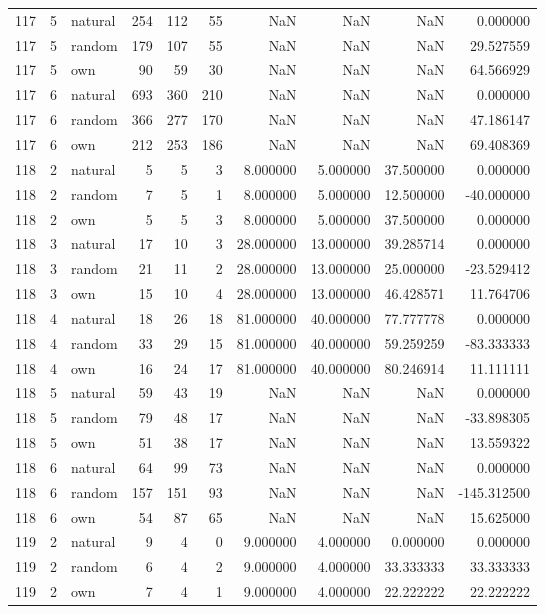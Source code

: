 \begin{table}[htbp]
\begin{tabular}{rrlrrrrrrr}
117 & 5 & natural & 254 & 112 & 55 & NaN & NaN & NaN & 0.000000 \\
117 & 5 & random & 179 & 107 & 55 & NaN & NaN & NaN & 29.527559 \\
117 & 5 & own & 90 & 59 & 30 & NaN & NaN & NaN & 64.566929 \\
117 & 6 & natural & 693 & 360 & 210 & NaN & NaN & NaN & 0.000000 \\
117 & 6 & random & 366 & 277 & 170 & NaN & NaN & NaN & 47.186147 \\
117 & 6 & own & 212 & 253 & 186 & NaN & NaN & NaN & 69.408369 \\
118 & 2 & natural & 5 & 5 & 3 & 8.000000 & 5.000000 & 37.500000 & 0.000000 \\
118 & 2 & random & 7 & 5 & 1 & 8.000000 & 5.000000 & 12.500000 & -40.000000 \\
118 & 2 & own & 5 & 5 & 3 & 8.000000 & 5.000000 & 37.500000 & 0.000000 \\
118 & 3 & natural & 17 & 10 & 3 & 28.000000 & 13.000000 & 39.285714 & 0.000000 \\
118 & 3 & random & 21 & 11 & 2 & 28.000000 & 13.000000 & 25.000000 & -23.529412 \\
118 & 3 & own & 15 & 10 & 4 & 28.000000 & 13.000000 & 46.428571 & 11.764706 \\
118 & 4 & natural & 18 & 26 & 18 & 81.000000 & 40.000000 & 77.777778 & 0.000000 \\
118 & 4 & random & 33 & 29 & 15 & 81.000000 & 40.000000 & 59.259259 & -83.333333 \\
118 & 4 & own & 16 & 24 & 17 & 81.000000 & 40.000000 & 80.246914 & 11.111111 \\
118 & 5 & natural & 59 & 43 & 19 & NaN & NaN & NaN & 0.000000 \\
118 & 5 & random & 79 & 48 & 17 & NaN & NaN & NaN & -33.898305 \\
118 & 5 & own & 51 & 38 & 17 & NaN & NaN & NaN & 13.559322 \\
118 & 6 & natural & 64 & 99 & 73 & NaN & NaN & NaN & 0.000000 \\
118 & 6 & random & 157 & 151 & 93 & NaN & NaN & NaN & -145.312500 \\
118 & 6 & own & 54 & 87 & 65 & NaN & NaN & NaN & 15.625000 \\
119 & 2 & natural & 9 & 4 & 0 & 9.000000 & 4.000000 & 0.000000 & 0.000000 \\
119 & 2 & random & 6 & 4 & 2 & 9.000000 & 4.000000 & 33.333333 & 33.333333 \\
119 & 2 & own & 7 & 4 & 1 & 9.000000 & 4.000000 & 22.222222 & 22.222222 \\

\end{tabular}
\end{table}
